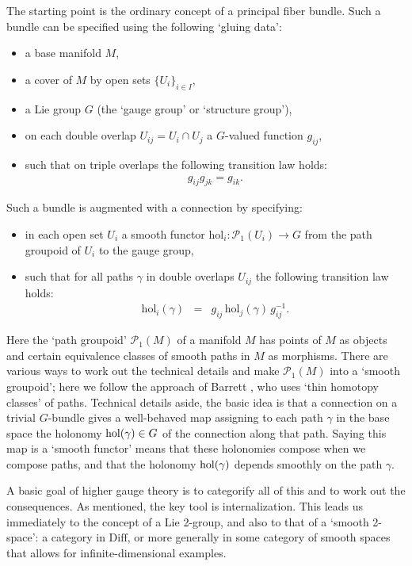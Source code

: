 \documentclass{article}
\newcommand{\maps}{\colon}
\newcommand{\Diff}{\mathrm{Diff}}
\renewcommand{\P}{\mathcal{P}}
\def\hol {{\rm hol}}
\def\manifold {{M}}
\def\of #1{\!\left({#1}\right)}
\begin{document}
The starting point is the ordinary concept of a 
principal fiber bundle.  Such a bundle can be specified using the 
following `gluing data': 
\begin{itemize}
  \item
    a base manifold $M$,
  \item
    a cover of $M$ by open sets $\{U_i\}_{i\in I}$,
  \item
    a Lie group $G$ (the `gauge group' or `structure group'), 
  \item
    on each double overlap $U_{ij} = U_i \cap U_j$ a 
    $G$-valued function $g_{ij}$, 
  \item
    such that on triple overlaps
    the following transition law holds:
    \begin{eqnarray}
       g_{ij} g_{jk} = g_{ik}.
       \nonumber
    \end{eqnarray}
\end{itemize}
Such a bundle is augmented with a connection by specifying:
\begin{itemize}
  \item
    in each open set $U_i$ a smooth functor $\mathrm{hol}_i \maps
    \P_1(U_i) \to G$ from the path groupoid of $U_i$ to the gauge group, 
  \item
   such that for all paths $\gamma$ in double overlaps $U_{ij}$
   the following transition law holds:
   \begin{eqnarray}
     \mathrm{hol}_i\of{\gamma} &=& 
      g_{ij} \, \mathrm{hol}_j\of{\gamma} \,  g_{ij}^{-1}.
     \nonumber
   \end{eqnarray}
\end{itemize}
Here the `path groupoid' $\P_1(\manifold)$ of a manifold $\manifold$ 
has points of $\manifold$ as objects and certain equivalence classes 
of smooth paths in $\manifold$ as morphisms.  There are various ways 
to work out the technical details and make $\P_1(\manifold)$ into a 
`smooth groupoid'; here we follow the approach of Barrett \cite{Barrett:1991}, 
who uses `thin homotopy classes' of paths.  Technical details aside, 
the basic idea is that a connection on a trivial $G$-bundle gives a 
well-behaved map assigning to each path $\gamma$ in the base space the 
holonomy $\hol(\gamma) \in G$ of the connection along that path.   
Saying this map is a `smooth functor' means that these holonomies 
compose when we compose paths, and that the holonomy $\hol(\gamma)$ 
depends smoothly on the path $\gamma$.

A basic goal of higher gauge theory is to categorify all of this and to work 
out the consequences.  As mentioned, the key tool is internalization.  
This leads us immediately to the concept of a Lie 2-group, and also 
to that of a `smooth 2-space': a category in $\Diff$, or more generally 
in some category of smooth spaces that allows for infinite-dimensional 
examples.  
\end{document}
